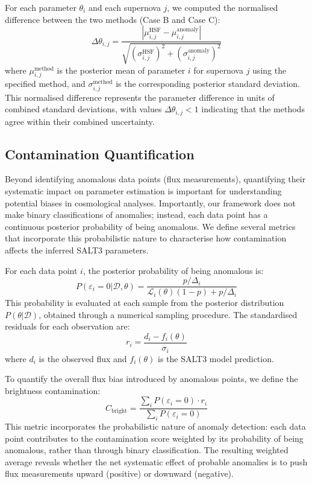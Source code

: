 For each parameter $\theta_i$ and each supernova $j$, we computed the normalised difference between the two methods (Case B and Case C):
\begin{equation}
\Delta\theta_{i,j} = \frac{|\mu_{i,j}^{\mathrm{HSF}} - \mu_{i,j}^{\mathrm{anomaly}}|}{\sqrt{(\sigma_{i,j}^{\mathrm{HSF}})^2 + (\sigma_{i,j}^{\mathrm{anomaly}})^2}}
\end{equation}
where $\mu_{i,j}^{\mathrm{method}}$ is the posterior mean of parameter $i$ for supernova $j$ using the specified method, and $\sigma_{i,j}^{\mathrm{method}}$ is the corresponding posterior standard deviation. This normalised difference represents the parameter difference in units of combined standard deviations, with values $\Delta\theta_{i,j} < 1$ indicating that the methods agree within their combined uncertainty.

\subsection{Contamination Quantification}
\label{subsec:contamination_quantification}

Beyond identifying anomalous data points (flux measurements), quantifying their systematic impact on parameter estimation is important for understanding potential biases in cosmological analyses. Importantly, our framework does not make binary classifications of anomalies; instead, each data point has a continuous posterior probability of being anomalous. We define several metrics that incorporate this probabilistic nature to characterise how contamination affects the inferred SALT3 parameters.

For each data point $i$, the posterior probability of being anomalous is:
\begin{equation}
    P(\varepsilon_i = 0 | \mathcal{D}, \theta) = \frac{p/\Delta_i}{\mathcal{L}_i(\theta)(1-p) + p/\Delta_i}
\end{equation}
This probability is evaluated at each sample from the posterior distribution $P(\theta|\mathcal{D})$, obtained through a numerical sampling procedure. The standardised residuals for each observation are:
\begin{equation}
    r_i = \frac{d_i - f_i(\theta)}{\sigma_i}
\end{equation}
where $d_i$ is the observed flux and $f_i(\theta)$ is the SALT3 model prediction.

To quantify the overall flux bias introduced by anomalous points, we define the brightness contamination:
\begin{equation}
    C_{\mathrm{bright}} = \frac{\sum_i P(\varepsilon_i = 0) \cdot r_i}{\sum_i P(\varepsilon_i = 0)}
\end{equation}
This metric incorporates the probabilistic nature of anomaly detection: each data point contributes to the contamination score weighted by its probability of being anomalous, rather than through binary classification. The resulting weighted average reveals whether the net systematic effect of probable anomalies is to push flux measurements upward (positive) or downward (negative).

